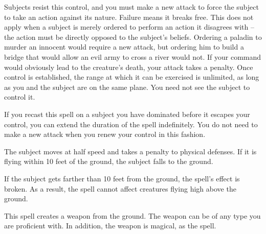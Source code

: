 \begin{spelleffect}
    \par Subjects resist this control, and you must make a new attack to force the subject to take an action against its nature. Failure means it breaks free. This does not apply when a subject is merely ordered to perform an action it disagrees with -- the action must be directly opposed to the subject's beliefs. Ordering a paladin to murder an innocent would require a new attack, but ordering him to build a bridge that would allow an evil army to cross a river would not. If your command would obviously lead to the creature's death, your attack takes a  penalty. Once control is established, the range at which it can be exercised is unlimited, as long as you and the subject are on the same plane. You need not see the subject to control it.
    \par If you recast this spell on a subject you have dominated before it escapes your control, you can extend the duration of the spell indefinitely. You do not need to make a new attack when you renew your control in this fashion.
\end{spelleffect}

\begin{comment}
\subsubsection{E}
\end{comment}

\spelldur{\durshort}
\begin{spelleffect}
    The subject moves at half speed and takes a  penalty to physical defenses. If it is flying within 10 feet of the ground, the subject falls to the ground.
\end{spelleffect}
\begin{spellnotes}
    If the subject gets farther than 10 feet from the ground, the spell's effect is broken. As a result, the spell cannot affect creatures flying high above the ground.
\end{spellnotes}

\spelldur{\durlong \dismissable}
\begin{spelleffect}
    This spell creates a weapon from the ground. The weapon can be of any type you are proficient with. In addition, the weapon is magical, as the  spell.
\end{spelleffect}

